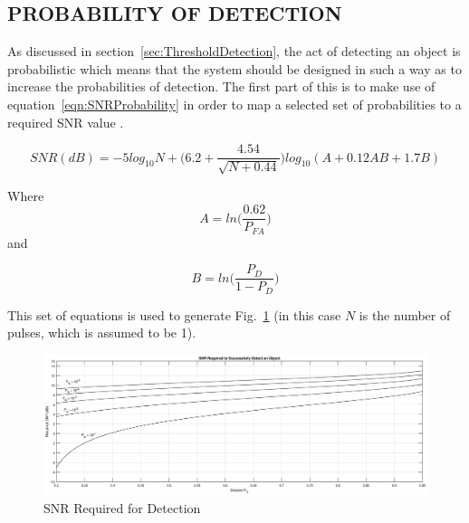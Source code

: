 \documentclass[11pt]{witseiepaper}
\begin{document}
\begin{bibunit}[witseie]
\section{PROBABILITY OF DETECTION} \label{sec:SNRProbability}
As discussed in section~\ref{sec:ThresholdDetection}, the act of detecting an object is probabilistic which means that the system should be designed in such a way as to increase the probabilities of detection. 
The first part of this is to make use of equation~\ref{eqn:SNRProbability} in order to map a selected set of probabilities to a required SNR value \cite[p.~107]{radarHandbook}.

\begin{equation} \label{eqn:SNRProbability}
SNR (dB) = -5 log_{10}N + \Bigg(6.2 + \frac{4.54}{\sqrt{N + 0.44}}\Bigg) log_{10}(A + 0.12 A B + 1.7 B)
\end{equation}

Where 
\begin{equation} \label{eqn:A}
A = ln \Bigg( \frac{0.62}{P_{FA}} \Bigg)
\end{equation}
and 

\begin{equation} \label{eqn:B}
B = ln \Bigg( \frac{P_D}{1 - P_D} \Bigg)
\end{equation}

This set of equations is used to generate Fig.~\ref{fig:SNRRequired} (in this case $N$ is the number of pulses, which is assumed to be 1).

\begin{center}
    \begin{figure}
        \includegraphics[width=\textwidth]{ProbabilityDetection.eps}
        \caption{SNR Required for Detection}
        \label{fig:SNRRequired}    
    \end{figure}
\end{center}


\end{bibunit}
\end{document}

